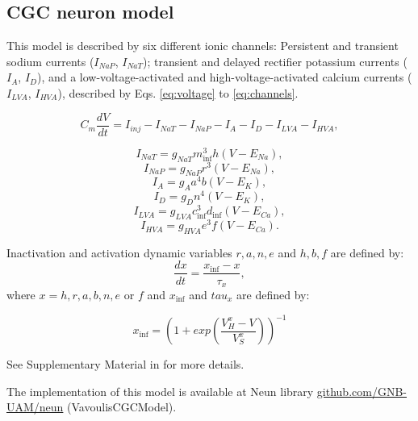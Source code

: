\subsection{CGC neuron model}
 This model is described by six different ionic channels: Persistent and transient sodium currents ($I_{NaP}$, $I_{NaT}$); transient and delayed rectifier potassium currents ($I_A$, $I_D$), and a low-voltage-activated and high-voltage-activated calcium currents ($I_{LVA}$, $I_{HVA}$), described by Eqs. \ref{eq:voltage} to \ref{eq:channels}. 
 
  \begin{equation}
 	C_m\frac{dV}{dt} = I_{inj} - I_{NaT} - I_{NaP} - I_{A} - I_{D} - I_{LVA} - I_{HVA},
 	\label{eq:voltage}
 \end{equation}
 
 \begin{equation}
 	I_{NaT} = g_{NaT} m_{{\inf}}^3 h (V - E_{Na}),
 \end{equation}
 \begin{equation}
 	I_{NaP} = g_{NaP} r^3 (V - E_{Na}),
 \end{equation}
 \begin{equation}
 	I_{A} = g_{A} a^4 b (V - E_{K}),
 \end{equation}
 \begin{equation}
 	I_{D} = g_{D} n^4 (V - E_{K}),
 \end{equation}
 \begin{equation}
 	I_{LVA} = g_{LVA} c_{{\inf}}^3 d_{{\inf}} (V - E_{Ca}),
 \end{equation}
 \begin{equation}
 	I_{HVA} = g_{HVA} e^3 f (V - E_{Ca}).
 	\label{eq:channels}
 \end{equation}

Inactivation and activation dynamic variables $r,a,n,e$ and $h,b,f$ are defined by:
\begin{equation}
	\frac{dx}{dt} = \frac{x_{\inf}-x}{\tau_x},
	\end{equation}
where $x = h,r,a,b,n,e$ or $f$ and $x_{\inf}$ and $tau_x$ are defined by:

\begin{equation}
	x_{\inf} = {(1+exp(\frac{V_H^x-V}{V_S^x}))}^{-1}
\end{equation}

See Supplementary Material in \cite{vavoulis_balanced_2010} for more details. 

The implementation of this model is available at Neun library \href{https://github.com/GNB-UAM/neun}{github.com/GNB-UAM/neun} (VavoulisCGCModel).

